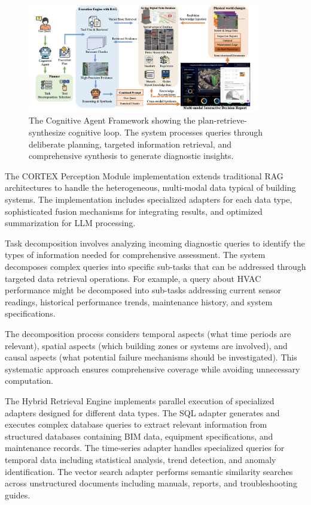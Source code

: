 \begin{figure}[htbp]
\centering
\includegraphics[width=0.9\textwidth]{figures/DefectGPT/cognitive_agent_framework.png}
\caption{The Cognitive Agent Framework showing the plan-retrieve-synthesize cognitive loop. The system processes queries through deliberate planning, targeted information retrieval, and comprehensive synthesis to generate diagnostic insights.}
\label{fig:cognitive_agent_framework}
\end{figure}

The CORTEX Perception Module implementation extends traditional RAG architectures to handle the heterogeneous, multi-modal data typical of building systems. The implementation includes specialized adapters for each data type, sophisticated fusion mechanisms for integrating results, and optimized summarization for LLM processing.

Task decomposition involves analyzing incoming diagnostic queries to identify the types of information needed for comprehensive assessment. The system decomposes complex queries into specific sub-tasks that can be addressed through targeted data retrieval operations. For example, a query about HVAC performance might be decomposed into sub-tasks addressing current sensor readings, historical performance trends, maintenance history, and system specifications.

The decomposition process considers temporal aspects (what time periods are relevant), spatial aspects (which building zones or systems are involved), and causal aspects (what potential failure mechanisms should be investigated). This systematic approach ensures comprehensive coverage while avoiding unnecessary computation.

The Hybrid Retrieval Engine implements parallel execution of specialized adapters designed for different data types. The SQL adapter generates and executes complex database queries to extract relevant information from structured databases containing BIM data, equipment specifications, and maintenance records. The time-series adapter handles specialized queries for temporal data including statistical analysis, trend detection, and anomaly identification. The vector search adapter performs semantic similarity searches across unstructured documents including manuals, reports, and troubleshooting guides.

